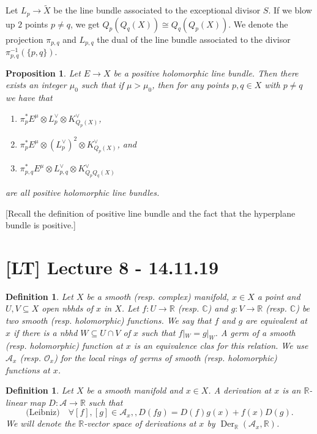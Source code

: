 \documentclass[12pt]{article}
\theoremstyle{darkgreentheorem}
\newtheorem{prop}[thm]{Proposition}
\theoremstyle{darkbluedefinition}
\newtheorem{defn}[thm]{Definition}
\theoremstyle{darkredexample}
\theoremstyle{remark}
\newcommand{\R}{\mathbb{R}}
\newcommand{\1}{\mathbbm{1}}
\newcommand{\C}{\mathbb{C}}
\newcommand{\calA}{\mathcal{A}}
\renewcommand{\O}{\mathcal{O}}
\DeclareMathOperator{\Der}{Der}
\newcommand{\ot}{\otimes}
\newcommand{\dual}{^{\vee}}
\newcommand{\sub}{\subseteq}
\begin{document}
Let $L_{p}\to \tilde{X}$ be the line bundle associated to the exceptional divisor $S$.
If we blow up $2$ points $p\neq q$, we get $Q_{p}(Q_{q}(X))\cong Q_{q}(Q_{p}(X))$.
We denote the projection $\pi_{p,q}$ and $L_{p,q}$ the dual of the line bundle associated to the divisor $\pi_{p,q}^{-1}(\{p,q\})$.

\begin{prop}
    Let $E\to X$ be a positive holomorphic line bundle.
    Then there exists an integer $\mu_{0}$ such that if $\mu >\mu_{0}$, then for any points $p,q\in X$ with $p\neq q$ we have that
    \begin{enumerate}
	\item $\pi_{p}^{*}E^{\mu}\ot L_{p}\dual \ot K_{Q_{p}(X)}\dual $,
	\item $\pi_{p}^{*}E^{\mu}\ot (L_{p}\dual)^{2}\ot K_{Q_{p}(X)}\dual $, and
	\item $\pi_{p,q}^{*}E^{\mu}\ot L_{p,q}\dual \ot K_{Q_{p}Q_{q}(X)}\dual $
    \end{enumerate}
    are all positive holomorphic line bundles.
\end{prop}

[Recall the definition of positive line bundle and the fact that the hyperplane bundle is positive.]

\section{[LT] Lecture 8 - 14.11.19}

\begin{defn}
    Let $X$ be a smooth (resp. complex) manifold, $x\in X$ a point and $U,V\sub X$ open nbhds of $x$ in $X$.
    Let $f\colon U\to \R$ (resp. $\C$) and $g\colon V\to \R$ (resp. $\C$) be two smooth (resp. holomorphic) functions.
    We say that $f$ and $g$ are equivalent at $x$ if there is a nbhd $W\subseteq U\cap V$ of $x$ such that $f|_{W}=g|_{W}$.
    A \textit{germ of a smooth (resp. holomorphic) function} at $x$ is an equivalence clas for this relation.
    We use $\calA_{x}$ (resp. $\O_{x}$) for the local rings of germs of smooth (resp. holomorphic) functions at $x$.
\end{defn}

\begin{defn}
    Let $X$ be a smooth manifold and $x\in X$.
    A \textit{derivation at $x$} is an $\R$-linear map $D\colon \calA\to \R$ such that
    \[ \text{(Leibniz)} \quad \forall [f],[g]\in \calA_{x},, D(fg)=D(f)g(x)+f(x)D(g).\]
    We will denote the $\R$-vector space of derivations at $x$ by $\Der_{\R}(\calA_{x},\R)$.
\end{defn}
\end{document}
